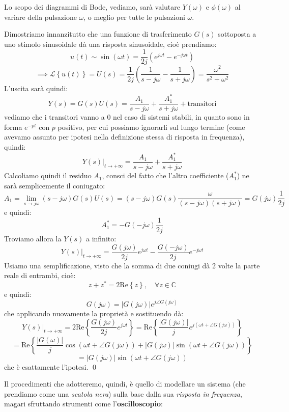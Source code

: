 \documentclass[a4paper,11pt]{article}
\begin{document}
\par\medskip

Lo scopo dei diagrammi di Bode, vediamo, sarà valutare $Y(\omega)$ e $\phi(\omega)$ al variare della pulsazione $\omega$, o meglio per tutte le pulsazioni $\omega$.

Dimostriamo innanzitutto che una funzione di trasferimento $G(s)$ sottoposta a uno stimolo sinusoidale dà una risposta sinusoidale, cioè prendiamo:
$$
u(t) \sim \sin(\omega t) = \frac{1}{2j} \left( e^{j \omega t} - e^{-j \omega t} \right)
$$
$$
\implies \mathcal{L}\left\{u(t)\right\} = U(s) = \frac{1}{2j} \left( \frac{1}{s- j\omega} - \frac{1}{s + j\omega} \right) = \frac{\omega^2}{s^2 + \omega^2}
$$
L'uscita sarà quindi:
$$
Y(s) = G(s) U(s) = \frac{A_1}{s - j \omega} + \frac{A_1^*}{s + j \omega} + \text{transitori}
$$
vediamo che i transitori vanno a $0$ nel caso di sistemi stabili, in quanto sono in forma $e^{-pt}$ con $p$ positivo, per cui possiamo ignorarli sul lungo termine (come avevamo assunto per ipotesi nella definizione stessa di risposta in frequenza), quindi:
$$
Y(s) \Big|_{t \rightarrow +\infty} = \frac{A_1}{s - j \omega} + \frac{A_1^*}{s + j \omega}
$$
Calcoliamo quindi il residuo $A_1$, consci del fatto che l'altro coefficiente ($A_1^*$) ne sarà semplicemente il coniugato:
$$
A_1 = \lim_{s \rightarrow j \omega} (s - j \omega) G(s) U(s) = (s - j \omega) G(s) \frac{\omega}{(s - j \omega)(s + j \omega)} = G(j \omega) \frac{1}{2j}
$$
e quindi:
$$
A_1^* = -G(-j \omega) \frac{1}{2j}
$$
Troviamo allora la $Y(s)$ a infinito:
$$
Y(s) \Big|_{t \rightarrow +\infty} = \frac{G(j\omega)}{2j} e^{j \omega t} - \frac{G(- j\omega)}{2j} e^{-j \omega t}
$$
Usiamo una semplificazione, visto che la somma di due coniugi dà 2 volte la parte reale di entrambi, cioè:
$$
z + z^* = 2 \mathrm{Re}\left\{z\right\}, \quad \forall z \in \mathbb{C}
$$
e quindi:
$$
G(j \omega) = |G(j \omega)| e^{j \angle G(j \omega)}
$$
che applicando nuovamente la proprietà e sostituendo dà:
$$
Y(s) \Big|_{t \rightarrow +\infty} = 2 \mathrm{Re} \left\{ \frac{G(j \omega)}{2j} e^{j \omega t} \right\} = \mathrm{Re} \left\{ \frac{|G(j \omega)|}{j} e^{j(\omega t + \angle G(j \omega))} \right\}
$$
$$
= \mathrm{Re} \left\{ \frac{|G(\omega)|}{j} \cos(\omega t + \angle G(j \omega)) + |G(j \omega)| \sin(\omega t + \angle G(j \omega)) \right\}
$$
$$
=|G(j \omega)| \sin(\omega t + \angle G(j \omega))
$$
che è esattamente l'ipotesi. \qed

\par\smallskip

Il procedimenti che adotteremo, quindi, è quello di modellare un sistema (che prendiamo come una \textit{scatola nera}) sulla base dalla sua \textit{risposta in frequenza}, magari sfruttando strumenti come l'\textbf{oscilloscopio}:
\end{document}
